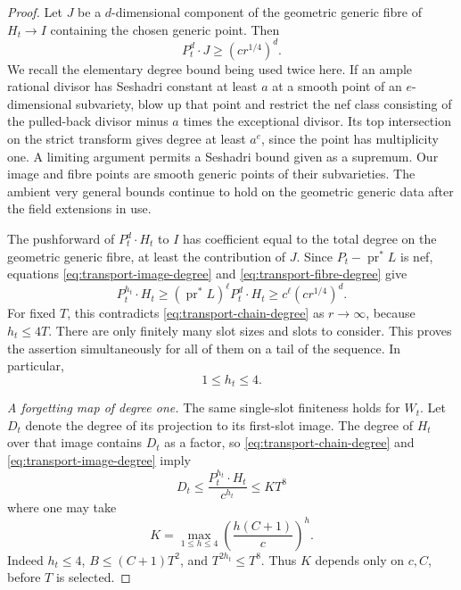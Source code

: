 \begin{proof}
Let \(J\) be a \(d\)-dimensional component of the geometric generic
fibre of \(H_t\to I\) containing the chosen generic point.  Then
\begin{equation}\label{eq:transport-fibre-degree}
 P_t^d\cdot J\ge (cr^{1/4})^d.
\end{equation}
We recall the elementary degree bound being used twice here.  If an
ample rational divisor has Seshadri constant at least \(a\) at a
smooth point of an \(e\)-dimensional subvariety, blow up that point
and restrict the nef class consisting of the pulled-back divisor minus
\(a\) times the exceptional divisor.  Its top intersection on the
strict transform gives degree at least \(a^e\), since the point has
multiplicity one.  A limiting argument permits a Seshadri bound given
as a supremum.  Our image and fibre points are smooth generic points
of their subvarieties.  The ambient very general bounds continue to
hold on the geometric generic data after the field extensions in use.

The pushforward of \(P_t^d\cdot H_t\) to \(I\) has coefficient
equal to the total degree on the geometric generic fibre, at least
the contribution of \(J\).  Since
\(P_t-\operatorname{pr}^*L\) is nef, equations
\eqref{eq:transport-image-degree} and
\eqref{eq:transport-fibre-degree} give
\[
 P_t^{h_t}\cdot H_t
 \ge (\operatorname{pr}^*L)^\ell P_t^d\cdot H_t
 \ge c^\ell(cr^{1/4})^d.
\]
For fixed \(T\), this contradicts
\eqref{eq:transport-chain-degree} as \(r\to\infty\), because
\(h_t\le4T\).  There are only finitely many slot sizes and slots to
consider.  This proves the assertion simultaneously for all of them
on a tail of the sequence.  In particular,
\begin{equation}\label{eq:transport-ranks}
 1\le h_t\le4.
\end{equation}

\medskip\noindent
\emph{A forgetting map of degree one.}
The same single-slot finiteness holds for \(W_t\).  Let \(D_t\)
denote the degree of its projection to its first-slot image.  The
degree of \(H_t\) over that image contains \(D_t\) as a factor, so
\eqref{eq:transport-chain-degree} and
\eqref{eq:transport-image-degree} imply
\begin{equation}\label{eq:transport-degree-bound}
 D_t\le \frac{P_t^{h_t}\cdot H_t}{c^{h_t}}
       \le K T^8
\end{equation}
where one may take
\[
 K=\max_{1\le h\le4}\left(\frac{h(C+1)}c\right)^h.
\]
Indeed \(h_t\le4\), \(B\le(C+1)T^2\), and \(T^{2h_t}\le T^8\).
Thus \(K\) depends only on \(c,C\), before \(T\) is selected.


\end{proof}
